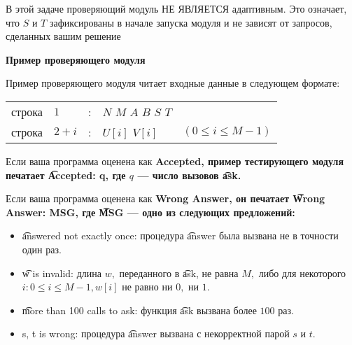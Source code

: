 В этой задаче проверяющий модуль НЕ ЯВЛЯЕТСЯ адаптивным. Это означает, что  $S$ и $T$  зафиксированы в начале запуска модуля и не зависят от запросов, сделанных вашим решение

\bf{Пример проверяющего модуля}

Пример проверяющего модуля читает входные данные в следующем формате:

\begin{tabular}{lllll}
строка&$1$&:&$N$ $M$ $A$ $B$ $S$ $T$&\\
строка&$2+i$&:&$U[i]$ $V[i]$&$(0 \le i \le M-1)$ \\
\end{tabular}

Если ваша программа оценена как \bf{Accepted}, пример тестирующего модуля печатает \t{Accepted: q}, где $q$ --- число вызовов \t{ask}.

Если ваша программа оценена как \bf{Wrong Answer}, он печатает \t{Wrong Answer: MSG}, где \t{MSG} --- одно из следующих предложений:

\begin{itemize}
\item \t{answered not exactly once}: процедура \t{answer} была вызвана не в точности один раз.
\item \t{w is invalid}: длина $w,$ переданного в \t{ask}, не равна $M,$ либо для некоторого $i : 0 \le i \le M-1, w[i]$ не равно ни $0,$ ни $1.$
\item \t{more than 100 calls to ask}: функция \t{ask} вызвана более $100$ раз.
\item \t{{s, t} is wrong}: процедура \t{answer} вызвана с некорректной парой $s$ и $t.$
\end{itemize}


